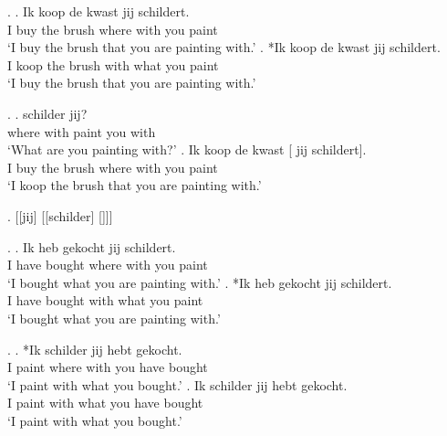 \documentclass[xcolor=dvipsnames,10pt]{beamer}
\begin{document}
\begin{frame}

\ex.\label{ex:headed}
\ag. Ik koop de kwast   jij schildert.\\
 I buy the brush where with you paint\\
 `I buy the brush that you are painting with.'
\bg. *Ik koop de kwast   jij schildert.\\
 I koop the brush with what you paint\\
 `I buy the brush that you are painting with.'

\end{frame}


\begin{frame}

\ex.
\ag.   schilder jij?\\
 where with paint you with\\
 `What are you painting with?'\label{ex:const2}
\bg. Ik koop de kwast [  jij schildert].\\
 I buy the brush where with you paint\\
 `I koop the brush that you are painting with.'\label{ex:const3}

\pause

\ex. [[jij] [[schilder] []]]\label{ex:const2stage}


\end{frame}



\begin{frame}

\ex.
\ag. Ik heb gekocht   jij schildert.\\
 I have bought where with you paint\\
 `I bought what you are painting with.'\label{ex:gekochtwaar-mee}
\bg. *Ik heb gekocht   jij schildert.\\
 I have bought with what you paint\\
 `I bought what you are painting with.'\label{ex:gekochtmetwat}

\pause

\ex.\label{ex:schildermet}
\ag. *Ik schilder   jij hebt gekocht.\\
 I paint where with you have bought\\
 `I paint with what you bought.'\label{ex:schilderwaar-mee}
\bg. Ik schilder   jij hebt gekocht.\\
 I paint with what you have bought\\
 `I paint with what you bought.'\label{ex:schildermetwat}


\end{frame}
\end{document}

